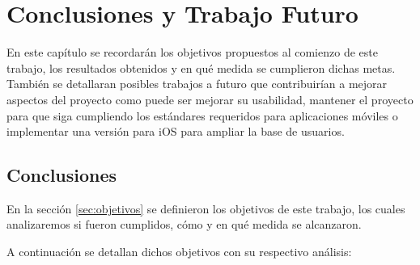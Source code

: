 \chapter{Conclusiones y Trabajo Futuro}

En este capítulo se recordarán los objetivos propuestos al comienzo de este trabajo, los resultados obtenidos y en qué medida se cumplieron dichas metas. También se detallaran posibles trabajos a futuro que contribuirían a mejorar aspectos del proyecto como puede ser mejorar su usabilidad, mantener el proyecto para que siga cumpliendo los estándares requeridos para aplicaciones móviles o implementar una versión para iOS para ampliar la base de usuarios.

\section{Conclusiones}
En la sección \ref{sec:objetivos} se definieron los objetivos de este trabajo, los cuales analizaremos si fueron cumplidos, cómo y en qué medida se alcanzaron.

A continuación se detallan dichos objetivos con su respectivo análisis:

